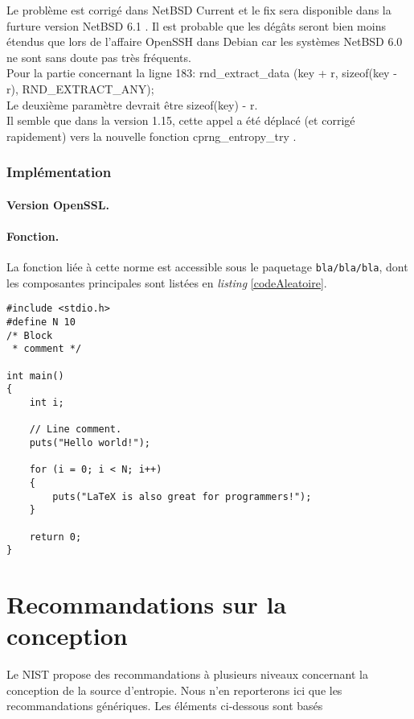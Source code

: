 			Le problème est corrigé dans NetBSD Current et le fix sera 
			disponible dans la furture version NetBSD 6.1
			\cite{diffNetBSD}.
			Il est probable que les dégâts seront bien moins étendus que 
			lors de l'affaire OpenSSH dans Debian car les systèmes 
			NetBSD 6.0 ne sont sans doute pas très fréquents.\\
			
			Pour la partie concernant la ligne 183: rnd\_extract\_data
			(key + r, sizeof(key - r), RND\_EXTRACT\_ANY);\\
			
			Le deuxième paramètre devrait être sizeof(key) - r.\\
			
			Il semble que dans la version 1.15, cette appel a été déplacé 
			(et corrigé	rapidement) vers la nouvelle fonction 
			cprng\_entropy\_try \cite{diffNetBSD}.
			
		\subsubsection{Implémentation}
			
			\paragraph{Version OpenSSL.\\}
			
			\paragraph{Fonction.\\}
			La fonction liée à cette norme est accessible sous le paquetage \texttt{bla/bla/bla}, 
			dont les composantes principales sont listées en \textit{listing} \ref{codeAleatoire}.
			
			
			\begin{lstlisting}[style=customc,caption=codeAleatoire.c, label=codeAleatoire]
#include <stdio.h>
#define N 10
/* Block
 * comment */
 
int main()
{
    int i;
 
    // Line comment.
    puts("Hello world!");
 
    for (i = 0; i < N; i++)
    {
        puts("LaTeX is also great for programmers!");
    }
 
    return 0;
}
		\end{lstlisting}


\section{Recommandations sur la conception}
Le NIST propose des recommandations à plusieurs niveaux concernant la conception de la source d'entropie. Nous n'en reporterons ici que les recommandations génériques. Les éléments ci-dessous sont basés 

